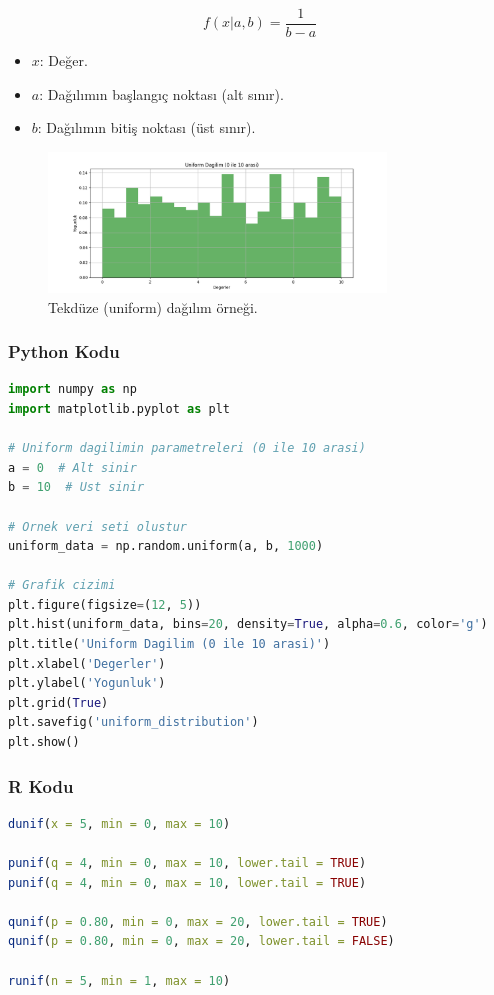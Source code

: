 \[f(x|a,b) = \frac{1}{b-a}\]
\begin{itemize}
	\item $x$: Değer.
	\item $a$: Dağılımın başlangıç noktası (alt sınır).
	\item $b$: Dağılımın bitiş noktası (üst sınır).
\end{itemize}

\begin{figure}[h]
    \centering
    \includegraphics[width=0.8\textwidth]{images/uniform_distribution.png}
    \caption{Tekdüze (uniform) dağılım örneği.}
    \label{fig:enter-label}
\end{figure}

\subsubsection{Python Kodu}

\begin{lstlisting}[language=Python]
import numpy as np
import matplotlib.pyplot as plt

# Uniform dagilimin parametreleri (0 ile 10 arasi)
a = 0  # Alt sinir
b = 10  # Ust sinir

# Ornek veri seti olustur
uniform_data = np.random.uniform(a, b, 1000)

# Grafik cizimi
plt.figure(figsize=(12, 5))
plt.hist(uniform_data, bins=20, density=True, alpha=0.6, color='g')
plt.title('Uniform Dagilim (0 ile 10 arasi)')
plt.xlabel('Degerler')
plt.ylabel('Yogunluk')
plt.grid(True)
plt.savefig('uniform_distribution')
plt.show()
\end{lstlisting}

\subsubsection{R Kodu}

\begin{lstlisting}[language=R]
dunif(x = 5, min = 0, max = 10)

punif(q = 4, min = 0, max = 10, lower.tail = TRUE)
punif(q = 4, min = 0, max = 10, lower.tail = TRUE)

qunif(p = 0.80, min = 0, max = 20, lower.tail = TRUE)
qunif(p = 0.80, min = 0, max = 20, lower.tail = FALSE)

runif(n = 5, min = 1, max = 10)
\end{lstlisting}


